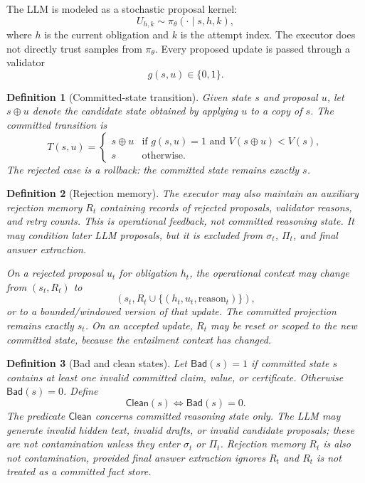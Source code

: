 \documentclass[11pt]{article}
\newtheorem{definition}{Definition}
\newcommand{\Bad}{\mathsf{Bad}}
\newcommand{\Clean}{\mathsf{Clean}}
\newcommand{\LLM}{\pi_\theta}
\newcommand{\pot}{V}
\begin{document}
The LLM is modeled as a stochastic proposal kernel:
\[
U_{h,k} \sim \LLM(\cdot \mid s, h, k),
\]
where $h$ is the current obligation and $k$ is the attempt index. The executor
does not directly trust samples from $\LLM$. Every proposed update is passed
through a validator
\[
g(s,u) \in \{0,1\}.
\]

\begin{definition}[Committed-state transition]
Given state $s$ and proposal $u$, let $s \oplus u$ denote the candidate state
obtained by applying $u$ to a copy of $s$. The committed transition is
\[
T(s,u) =
\begin{cases}
s \oplus u & \text{if } g(s,u)=1 \text{ and } \pot(s \oplus u) < \pot(s),\\
s & \text{otherwise.}
\end{cases}
\]
The rejected case is a rollback: the committed state remains exactly $s$.
\end{definition}

\begin{definition}[Rejection memory]
The executor may also maintain an auxiliary rejection memory $R_t$ containing
records of rejected proposals, validator reasons, and retry counts. This is
operational feedback, not committed reasoning state. It may condition later
LLM proposals, but it is excluded from $\sigma_t$, $\Pi_t$, and final answer
extraction.

On a rejected proposal $u_t$ for obligation $h_t$, the operational context may
change from $(s_t,R_t)$ to
\[
(s_t, R_t \cup \{(h_t,u_t,\mathrm{reason}_t)\}),
\]
or to a bounded/windowed version of that update. The committed projection
remains exactly $s_t$. On an accepted update, $R_t$ may be reset or scoped to
the new committed state, because the entailment context has changed.
\end{definition}

\begin{definition}[Bad and clean states]
Let $\Bad(s)=1$ if committed state $s$ contains at least one invalid committed
claim, value, or certificate. Otherwise $\Bad(s)=0$. Define
\[
\Clean(s) \iff \Bad(s)=0.
\]
The predicate $\Clean$ concerns committed reasoning state only. The LLM may
generate invalid hidden text, invalid drafts, or invalid candidate proposals;
these are not contamination unless they enter $\sigma_t$ or $\Pi_t$. Rejection
memory $R_t$ is also not contamination, provided final answer extraction ignores
$R_t$ and $R_t$ is not treated as a committed fact store.
\end{definition}
\end{document}

